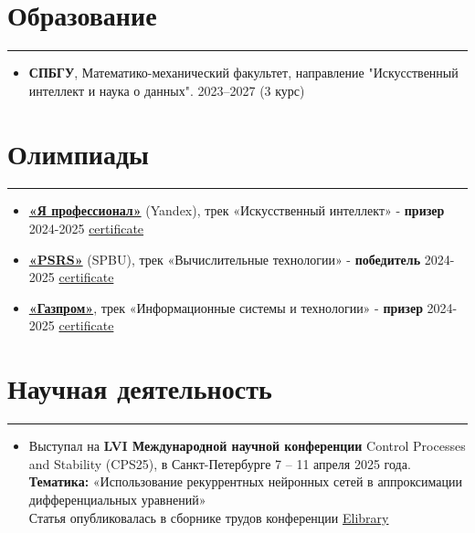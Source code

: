\documentclass[a4paper,14pt]{article}
\begin{document}
\section*{Образование}
\hrule
\vspace{0.5em}
\begin{itemize}
    \item \textbf{СПБГУ}, Математико-механический факультет, направление "Искусственный интеллект и наука о данных". 2023–2027 (3 курс)
\end{itemize}

\section*{Олимпиады}
\hrule
\vspace{0.5em}
\begin{itemize}
    \item \textbf{\href{https://yandex.ru/profi/?etext=}{«Я профессионал»}} (Yandex), трек «Искусственный интеллект» - \textbf{призер} 2024-2025 \href{https://github.com/Denigmma/Practice_LogBook/blob/main/Yandex/Я%20профессионал%20(olimp)/2024-2025/Нормативные%20документы%20и%20диплом/Диплом%20призера%20VIII%20сезона%20ЯП%20ИИ.pdf}{certificate}
    \item \textbf{\href{https://psrs.spbu.ru/}{«PSRS»}} (SPBU), трек «Вычислительные технологии» - \textbf{победитель} 2024-2025 \href{https://github.com/Denigmma/Practice_LogBook/blob/main/SPBU%20olympics%20Petropolitan%20Science%20(Re)Search/2024-2025/Diploma%20winner%2024-25.pdf}{certificate}
    \item \textbf{\href{https://studolymp.gazprom.ru/}{«Газпром»}}, трек «Информационные системы и технологии» - \textbf{призер} 2024-2025 \href{https://github.com/Denigmma/Practice_LogBook/blob/main/Gazprom/Диплом%20Мурадян%20Денис%20Степанович%20по%20профилю%20_Информационные%20системы%20и%20технологии_.pdf}{certificate}
\end{itemize}

\section*{Научная деятельность}
\hrule
\vspace{0.5em}
\begin{itemize}
    \item Выступал на \textbf{LVI Международной научной конференции} Control Processes and Stability (CPS25), в Санкт-Петербурге 7 – 11 апреля 2025 года. \\
    \textbf{Тематика:} «Использование рекуррентных нейронных сетей в аппроксимации дифференциальных уравнений»\\
    Статья опубликовалась в сборнике трудов конференции \href{https://www.elibrary.ru/item.asp?id=82486855}{Elibrary}
\end{itemize}
\end{document}
